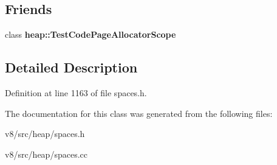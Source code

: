 \subsection*{Friends}
\begin{DoxyCompactItemize}
\item 
\mbox{\label{classv8_1_1internal_1_1MemoryAllocator_a52894013d0173f11f3ece6adc10d6c72}} 
class {\bfseries heap\+::\+Test\+Code\+Page\+Allocator\+Scope}
\end{DoxyCompactItemize}


\subsection{Detailed Description}


Definition at line 1163 of file spaces.\+h.



The documentation for this class was generated from the following files\+:\begin{DoxyCompactItemize}
\item 
v8/src/heap/spaces.\+h\item 
v8/src/heap/spaces.\+cc\end{DoxyCompactItemize}
